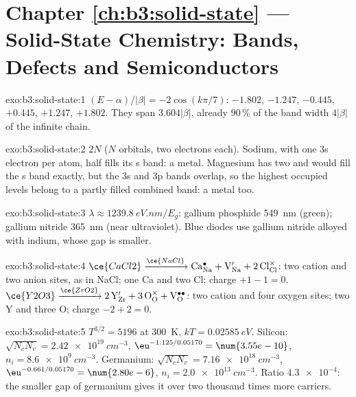 \section*{Chapter \ref{ch:b3:solid-state} --- Solid-State Chemistry: Bands, Defects and Semiconductors}

\begin{solution}{exo:b3:solid-state:1}
$(E - \alpha)/|\beta| = -2\cos(k\pi/7)$: $-1.802$, $-1.247$, $-0.445$, $+0.445$, $+1.247$, $+1.802$. They span
$3.604|\beta|$, already 90\,\% of the band width $4|\beta|$ of the infinite chain.
\end{solution}

\begin{solution}{exo:b3:solid-state:2}
$2N$ ($N$ orbitals, two electrons each). Sodium, with one 3s electron per atom, half
fills its s band: a metal. Magnesium has two and would fill the s band exactly,
but the 3s and 3p bands overlap, so the highest occupied levels belong to a
partly filled combined band: a metal too.
\end{solution}

\begin{solution}{exo:b3:solid-state:3}
$\lambda \approx \qty{1239.8}{eV.nm}/E_g$: gallium phosphide \qty{549}{nm} (green); gallium nitride \qty{365}{nm}
(near ultraviolet). Blue diodes use gallium nitride alloyed with indium, whose
gap is smaller.
\end{solution}

\begin{solution}{exo:b3:solid-state:4}
$\ce{CaCl2} \xrightarrow{\ce{NaCl}} \mathrm{Ca_{Na}^{\bullet} + V_{Na}' + 2\,Cl_{Cl}^{\times}}$: two cation and two anion sites, as in NaCl; one Ca and
two Cl; charge $+1 - 1 = 0$. $\ce{Y2O3} \xrightarrow{\ce{ZrO2}} \mathrm{2\,Y_{Zr}' + 3\,O_O^{\times} + V_O^{\bullet\bullet}}$: two cation and four oxygen sites; two Y
and three O; charge $-2 + 2 = 0$.
\end{solution}

\begin{solution}{exo:b3:solid-state:5}
$T^{3/2} = 5196$ at \qty{300}{K}, $kT = \qty{0.02585}{eV}$. Silicon: $\sqrt{N_cN_v} = \qty{2.42e19}{cm^{-3}}$, $\eu^{-1.125/0.05170} = \num{3.55e-10}$,
$n_i = \qty{8.6e9}{cm^{-3}}$. Germanium: $\sqrt{N_cN_v} = \qty{7.16e18}{cm^{-3}}$, $\eu^{-0.661/0.05170} = \num{2.80e-6}$, $n_i = \qty{2.0e13}{cm^{-3}}$. Ratio
$\num{4.3e-4}$: the smaller gap of germanium gives it over two thousand times more
carriers.
\end{solution}

